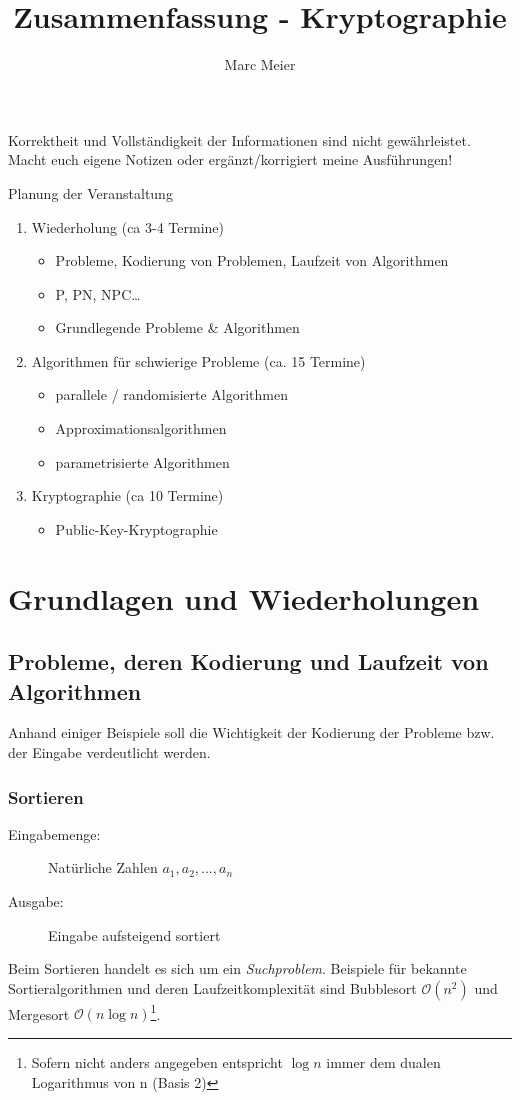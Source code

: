 \documentclass{article} %
\title{Zusammenfassung - Kryptographie}
\author{
	Marc Meier
}
\begin{document}
\maketitle
\begin{framed}Korrektheit und Vollständigkeit der Informationen sind nicht gewährleistet.
Macht euch eigene Notizen oder ergänzt/korrigiert meine Ausführungen!
\end{framed}
\setcounter{tocdepth}{1}
\tableofcontents

\begin{framed}
Planung der Veranstaltung %
\begin{enumerate}
	\item Wiederholung (ca 3-4 Termine)
	\begin{itemize}
		\item Probleme, Kodierung von Problemen, Laufzeit von Algorithmen
		\item P, PN, NPC…
		\item Grundlegende Probleme \& Algorithmen
	\end{itemize}
	\item Algorithmen für schwierige Probleme (ca. 15 Termine)
	\begin{itemize}
		\item parallele / randomisierte Algorithmen
		\item Approximationsalgorithmen
		\item parametrisierte Algorithmen
	\end{itemize}
	\item Kryptographie (ca 10 Termine)
	\begin{itemize}
		\item Public-Key-Kryptographie
	\end{itemize}
\end{enumerate}
\end{framed}
\section{Grundlagen und Wiederholungen}
\subsection{Probleme, deren Kodierung und Laufzeit von Algorithmen}
Anhand einiger Beispiele soll die Wichtigkeit der Kodierung der Probleme bzw. der Eingabe verdeutlicht werden.
\subsubsection{Sortieren}
\begin{description}
	\item[Eingabemenge:] Natürliche Zahlen $a_1, a_2,...,a_n$
	\item[Ausgabe:] Eingabe aufsteigend sortiert
\end{description}
Beim Sortieren handelt es sich um ein \emph{Suchproblem}.
Beispiele für bekannte Sortieralgorithmen und deren Laufzeitkomplexität sind Bubblesort $\mathcal{O}(n^2)$ und Mergesort $\mathcal{O}(n\log{}n)$\footnote{Sofern nicht anders angegeben entspricht $\log n$ immer dem dualen Logarithmus von n (Basis 2)}.
\end{document}
